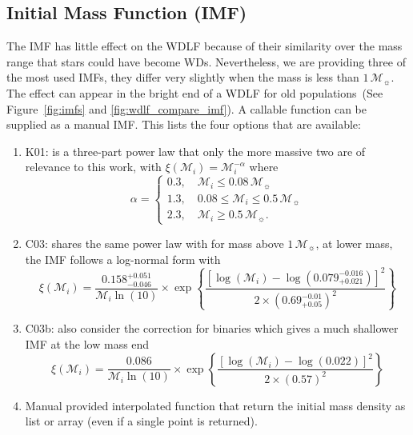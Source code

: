 \documentclass[fleqn,usenatbib]{rasti}
\newcommand{\msun}{\mathcal{M}_{\sun}}
\begin{document}
\subsection{Initial Mass Function (IMF)}
The IMF has little effect on the WDLF because of their similarity over the mass
range that stars could have become WDs. Nevertheless, we are providing three
of the most used IMFs, they differ very slightly when the mass is less than
$1\,\msun$. The effect can appear in the bright end of a WDLF for old
populations~(See Figure~\ref{fig:imfs} and \ref{fig:wdlf_compare_imf}). A
callable function can be supplied as a manual IMF. This lists the four options
that are available:

\begin{enumerate}
    \item K01: \citet{2001MNRAS.322..231K} is a three-part power law that only the
    more massive two are of relevance to this work, with
    $\xi(\mathcal{M}_i) = \mathcal{M}_i^{-\alpha}$ where
    \begin{equation}
        \alpha =
        \begin{cases}
            0.3, \quad \mathcal{M}_i \leq 0.08\,\msun\\
            1.3, \quad 0.08 \leq \mathcal{M}_i \leq 0.5\,\msun\\
            2.3, \quad \mathcal{M}_i \geq 0.5\,\msun.
        \end{cases}
    \end{equation}
    \item C03: \citet{2003PASP..115..763C} shares the same power law with
    \citet{2001MNRAS.322..231K} for mass above $1\,\msun$, at lower mass,
    the IMF follows a log-normal form with
    \begin{equation}
        \xi(\mathcal{M}_i) = \dfrac{0.158^{+0.051}_{-0.046}}{\mathcal{M}_i \ln(10)} \times
            \exp{\left\{\dfrac{\left[\log(\mathcal{M}_i) - \log\left(0.079^{-0.016}_{+0.021}\right)\right]^2}{2 \times (0.69^{-0.01}_{+0.05})^2}\right\}}
    \end{equation}
    \item C03b: \citet[][including binary]{2003PASP..115..763C} also consider the correction for binaries which gives a much shallower IMF at the low mass end
    \begin{equation}
        \xi(\mathcal{M}_i) = \dfrac{0.086}{\mathcal{M}_i \ln(10)} \times
            \exp{\left\{\dfrac{\left[\log(\mathcal{M}_i) - \log\left(0.022\right)\right]^2}{2 \times (0.57)^2}\right\}}
    \end{equation}
    \item Manual provided interpolated function that return the initial mass density as list or array (even if a single point is returned).
\end{enumerate}
\end{document}
